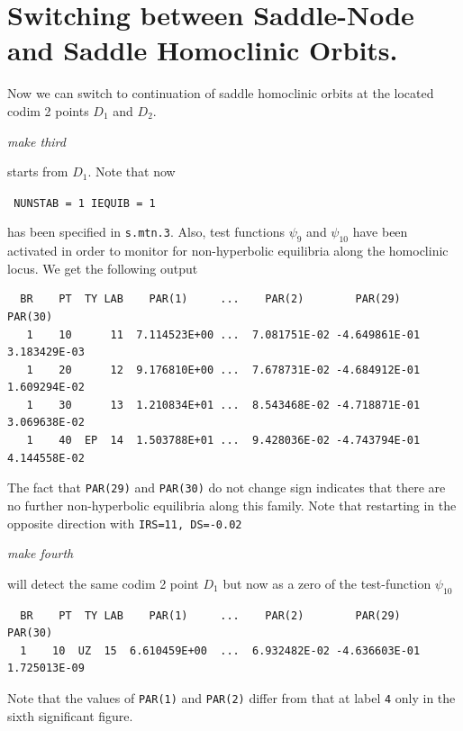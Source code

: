 \documentclass[12pt]{report}
\begin{document}
\section{Switching between Saddle-Node and Saddle Homoclinic Orbits.}
Now we can switch to continuation of saddle homoclinic orbits at the
located codim 2 points $D_1$ and $D_2$. 
\begin{center}
{\it make third}
\end{center}
starts from $D_1$. Note that now 
\begin{center}
{\tt 
NUNSTAB = 1 \quad IEQUIB = 1}  
\end{center}
has been specified in {\tt s.mtn.3}. Also, test functions $\psi_9$
and $\psi_{10}$ have been activated in order
to monitor for non-hyperbolic equilibria along the homoclinic locus. 
We get the following output
\begin{verbatim}
  BR    PT  TY LAB    PAR(1)     ...    PAR(2)        PAR(29)       PAR(30)    
   1    10      11  7.114523E+00 ...  7.081751E-02 -4.649861E-01  3.183429E-03
   1    20      12  9.176810E+00 ...  7.678731E-02 -4.684912E-01  1.609294E-02
   1    30      13  1.210834E+01 ...  8.543468E-02 -4.718871E-01  3.069638E-02
   1    40  EP  14  1.503788E+01 ...  9.428036E-02 -4.743794E-01  4.144558E-02
\end{verbatim}
The fact that {\tt PAR(29)} and {\tt PAR(30)} do not change sign indicates 
that there are no further non-hyperbolic equilibria
along this family. Note that restarting in the opposite direction with {\tt IRS=11,
DS=-0.02} 
\begin{center}
{\it make fourth}
\end{center}
will detect the same codim 2 point $D_1$ but now as a zero
of the test-function $\psi_{10}$
\begin{verbatim}
  BR    PT  TY LAB    PAR(1)     ...    PAR(2)        PAR(29)       PAR(30)
  1    10  UZ  15  6.610459E+00  ...  6.932482E-02 -4.636603E-01  1.725013E-09    
\end{verbatim}
Note that the values of {\tt PAR(1)} and {\tt PAR(2)} differ from that at label {\tt 4} 
only in the sixth significant figure. 
\end{document}

